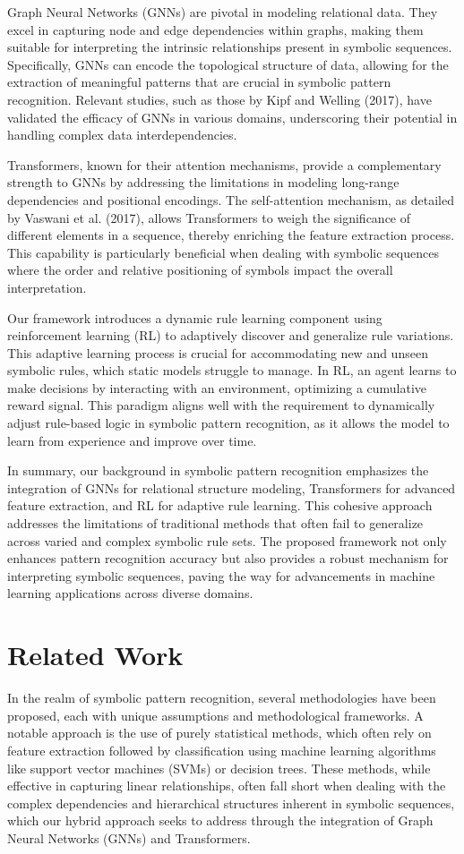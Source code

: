 \documentclass{article}
\begin{document}
Graph Neural Networks (GNNs) are pivotal in modeling relational data. They excel in capturing node and edge dependencies within graphs, making them suitable for interpreting the intrinsic relationships present in symbolic sequences. Specifically, GNNs can encode the topological structure of data, allowing for the extraction of meaningful patterns that are crucial in symbolic pattern recognition. Relevant studies, such as those by Kipf and Welling (2017), have validated the efficacy of GNNs in various domains, underscoring their potential in handling complex data interdependencies.

Transformers, known for their attention mechanisms, provide a complementary strength to GNNs by addressing the limitations in modeling long-range dependencies and positional encodings. The self-attention mechanism, as detailed by Vaswani et al. (2017), allows Transformers to weigh the significance of different elements in a sequence, thereby enriching the feature extraction process. This capability is particularly beneficial when dealing with symbolic sequences where the order and relative positioning of symbols impact the overall interpretation.

Our framework introduces a dynamic rule learning component using reinforcement learning (RL) to adaptively discover and generalize rule variations. This adaptive learning process is crucial for accommodating new and unseen symbolic rules, which static models struggle to manage. In RL, an agent learns to make decisions by interacting with an environment, optimizing a cumulative reward signal. This paradigm aligns well with the requirement to dynamically adjust rule-based logic in symbolic pattern recognition, as it allows the model to learn from experience and improve over time.

In summary, our background in symbolic pattern recognition emphasizes the integration of GNNs for relational structure modeling, Transformers for advanced feature extraction, and RL for adaptive rule learning. This cohesive approach addresses the limitations of traditional methods that often fail to generalize across varied and complex symbolic rule sets. The proposed framework not only enhances pattern recognition accuracy but also provides a robust mechanism for interpreting symbolic sequences, paving the way for advancements in machine learning applications across diverse domains.

\section{Related Work}
In the realm of symbolic pattern recognition, several methodologies have been proposed, each with unique assumptions and methodological frameworks. A notable approach is the use of purely statistical methods, which often rely on feature extraction followed by classification using machine learning algorithms like support vector machines (SVMs) or decision trees. These methods, while effective in capturing linear relationships, often fall short when dealing with the complex dependencies and hierarchical structures inherent in symbolic sequences, which our hybrid approach seeks to address through the integration of Graph Neural Networks (GNNs) and Transformers.
\end{document}
